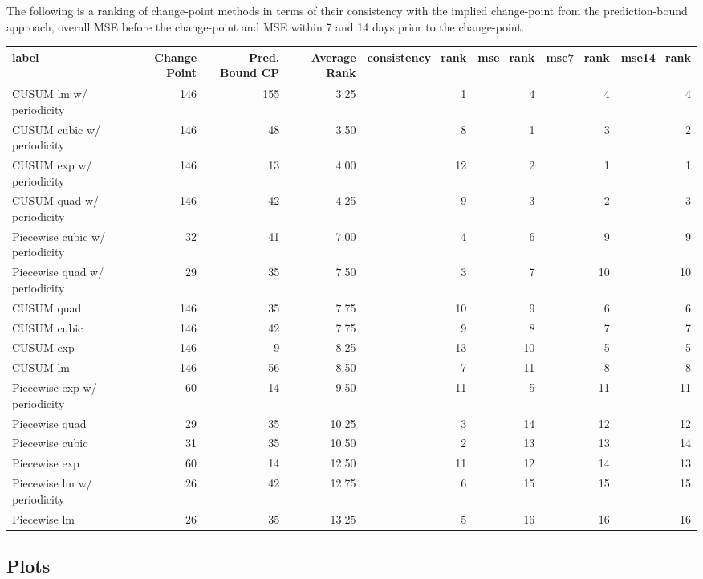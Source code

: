 \documentclass[
]{article}
\begin{document}
The following is a ranking of change-point methods in terms of their
consistency with the implied change-point from the prediction-bound
approach, overall MSE before the change-point and MSE within 7 and 14
days prior to the change-point.

\begin{table}
\centering
\begin{tabular}{l|r|r|r|r|r|r|r}
\hline
label & Change Point & Pred. Bound CP & Average Rank & consistency\_rank & mse\_rank & mse7\_rank & mse14\_rank\\
\hline
CUSUM lm w/ periodicity & 146 & 155 & 3.25 & 1 & 4 & 4 & 4\\
\hline
CUSUM cubic w/ periodicity & 146 & 48 & 3.50 & 8 & 1 & 3 & 2\\
\hline
CUSUM exp w/ periodicity & 146 & 13 & 4.00 & 12 & 2 & 1 & 1\\
\hline
CUSUM quad w/ periodicity & 146 & 42 & 4.25 & 9 & 3 & 2 & 3\\
\hline
Piecewise cubic w/ periodicity & 32 & 41 & 7.00 & 4 & 6 & 9 & 9\\
\hline
Piecewise quad w/ periodicity & 29 & 35 & 7.50 & 3 & 7 & 10 & 10\\
\hline
CUSUM quad & 146 & 35 & 7.75 & 10 & 9 & 6 & 6\\
\hline
CUSUM cubic & 146 & 42 & 7.75 & 9 & 8 & 7 & 7\\
\hline
CUSUM exp & 146 & 9 & 8.25 & 13 & 10 & 5 & 5\\
\hline
CUSUM lm & 146 & 56 & 8.50 & 7 & 11 & 8 & 8\\
\hline
Piecewise exp w/ periodicity & 60 & 14 & 9.50 & 11 & 5 & 11 & 11\\
\hline
Piecewise quad & 29 & 35 & 10.25 & 3 & 14 & 12 & 12\\
\hline
Piecewise cubic & 31 & 35 & 10.50 & 2 & 13 & 13 & 14\\
\hline
Piecewise exp & 60 & 14 & 12.50 & 11 & 12 & 14 & 13\\
\hline
Piecewise lm w/ periodicity & 26 & 42 & 12.75 & 6 & 15 & 15 & 15\\
\hline
Piecewise lm & 26 & 35 & 13.25 & 5 & 16 & 16 & 16\\
\hline
\end{tabular}
\end{table}

\hypertarget{plots-1}{%
\subsection{Plots}\label{plots-1}}
\end{document}
